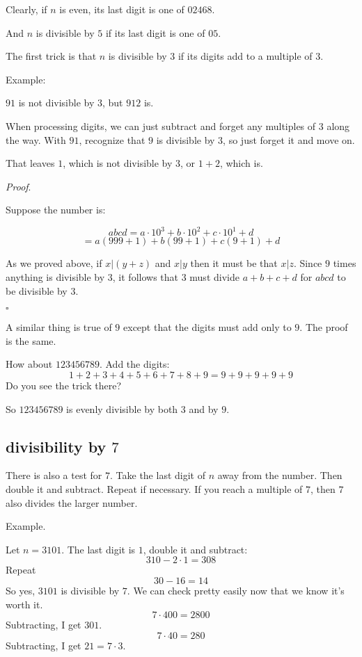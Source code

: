 \documentclass[11pt, oneside]{article}
\begin{document}
Clearly, if $n$ is even, its last digit is one of $02468$.

And $n$ is divisible by $5$ if its last digit is one of $05$.

The first trick is that $n$ is divisible by $3$ if its digits add to a multiple of $3$.

Example:

$91$ is not divisible by $3$, but $912$ is.  

When processing digits, we can just subtract and forget any multiples of $3$ along the way.  With $91$, recognize that $9$ is divisible by $3$, so just forget it and move on.  

That leaves $1$, which is not divisible by $3$, or $1 + 2$, which is.

\emph{Proof}.

Suppose the number is:

\[ abcd = a \cdot 10^3 + b \cdot 10^2 + c \cdot 10^1 + d \]
\[ = a (999 + 1) + b (99 + 1) + c (9 + 1) + d \]

As we proved above, if $x|(y+z)$ and $x|y$ then it must be that $x|z$.  Since $9$ times anything is divisible by $3$, it follows that $3$ must divide $a + b + c + d$ for $abcd$ to be divisible by $3$.

$\square$

A similar thing is true of $9$ except that the digits must add only to $9$.  The proof is the same.

How about $123456789$.  Add the digits:
\[ 1 + 2 + 3 + 4 + 5 + 6 + 7 + 8 + 9 = 9 + 9 + 9 + 9 + 9 \]
Do you see the trick there?

So $123456789$ is evenly divisible by both $3$ and by $9$.

\subsection*{divisibility by $7$}

There is also a test for $7$.  Take the last digit of $n$ away from the number.  Then double it and subtract.  Repeat if necessary.  If you reach a multiple of $7$, then $7$ also divides the larger number.

Example.

Let $n = 3101$.  The last digit is $1$, double it and subtract:
\[ 310 - 2 \cdot 1 = 308 \]
Repeat
\[ 30 - 16 = 14 \]
So yes, $3101$ is divisible by $7$.  We can check pretty easily now that we know it's worth it.
\[ 7 \cdot 400 = 2800 \]
Subtracting, I get $301$.
\[ 7 \cdot 40 = 280 \]
Subtracting, I get $21 = 7 \cdot 3$.  
\end{document}
